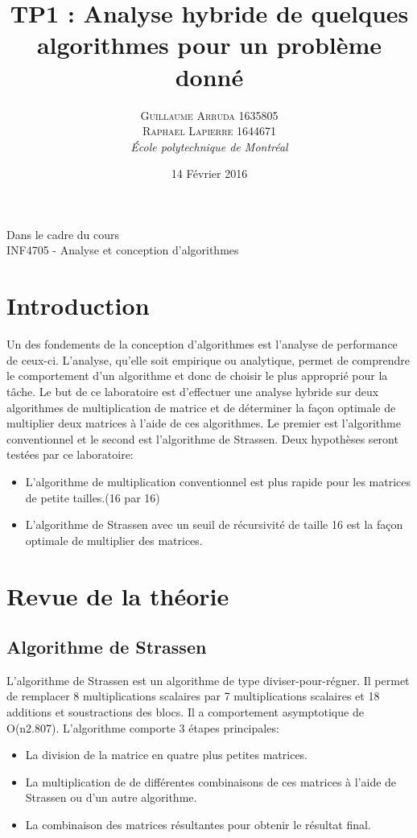 \documentclass[a4paper, 12pt]{article} %
\title{TP1 : Analyse hybride de quelques algorithmes pour un problème donné}
\author{\textsc{Guillaume Arruda 1635805\\Raphael Lapierre 1644671} %
\vspace{10pt}
\\{\textit{École polytechnique de Montréal}}} %
\date{14 Février 2016} %
\makeatletter
\renewcommand{\maketitle}{ %
\begin{center} %

\vspace*{25pt} %
{\LARGE\@title} %

\vspace{125pt} %

{\large\@author} %

\vspace{125pt} %
Dans le cadre du cours
\\INF4705 - Analyse et conception d'algorithmes
\vspace{125pt} %
\\\@date %
\vspace{125pt} %

\end{center}
}
\makeatother
\begin{document}
\thispagestyle{empty}
\clearpage\maketitle %
\pagebreak[4]
\tableofcontents
\pagebreak[4]

\setlength{\headheight}{15.0pt}
\pagestyle{fancy}
\fancyhead[C]{}

\section{Introduction}
Un des fondements de la conception d'algorithmes est l'analyse de performance de ceux-ci. L'analyse, qu'elle soit empirique ou analytique, permet de comprendre le comportement d'un algorithme
et donc de choisir le plus approprié pour la tâche. Le but de ce laboratoire est d'effectuer une analyse hybride sur deux algorithmes de multiplication de matrice et de déterminer la façon optimale de multiplier deux matrices à l'aide de ces algorithmes. Le premier est l'algorithme conventionnel et le second est l'algorithme de Strassen. Deux hypothèses seront testées par ce laboratoire:
\begin{itemize}
\item L'algorithme de multiplication conventionnel est plus rapide pour les matrices de petite tailles.(16 par 16)
\item L'algorithme de Strassen avec un seuil de récursivité de taille 16 est la façon optimale de multiplier des matrices.
\end{itemize}
\section{Revue de la théorie}
\subsection{Algorithme de Strassen}
L'algorithme de Strassen est un algorithme de type diviser-pour-régner. Il permet de remplacer 8 multiplications scalaires par 7 multiplications scalaires et 18 additions et soustractions des blocs. 
Il a comportement asymptotique de O(n2.807). L'algorithme comporte 3 étapes principales:
\begin{itemize}
\item La division de la matrice en quatre plus petites matrices.
\item La multiplication de de différentes combinaisons de ces matrices à l'aide de Strassen ou d'un autre algorithme.
\item La combinaison des matrices résultantes pour obtenir le résultat final.
\end{itemize}
\end{document}
